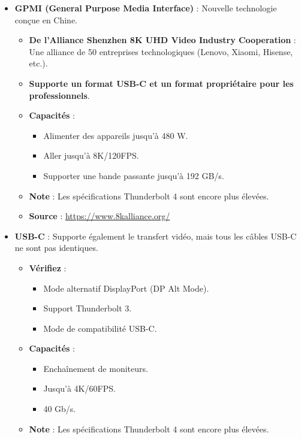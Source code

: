 \documentclass[10pt,a4paper]{article}
\begin{document}
\begin{itemize}
    \item \textbf{GPMI (General Purpose Media Interface)} : Nouvelle technologie conçue en Chine.
    \begin{itemize}
        \item \textbf{De l'Alliance Shenzhen 8K UHD Video Industry Cooperation} : Une alliance de 50 entreprises technologiques (Lenovo, Xiaomi, Hisense, etc.).
        \item \textbf{Supporte un format USB-C et un format propriétaire pour les professionnels}.
        \item \textbf{Capacités} :
        \begin{itemize}
            \item Alimenter des appareils jusqu'à 480 W.
            \item Aller jusqu'à 8K/120FPS.
            \item Supporter une bande passante jusqu'à 192 GB/s.
        \end{itemize}
        \item \textbf{Note} : Les spécifications Thunderbolt 4 sont encore plus élevées.
    \end{itemize}
    \begin{itemize}
        \item \textbf{Source} : \url{https://www.8kalliance.org/}
    \end{itemize}
\end{itemize}

\begin{itemize}
    \item \textbf{USB-C} : Supporte également le transfert vidéo, mais tous les câbles USB-C ne sont pas identiques.
    \begin{itemize}
        \item \textbf{Vérifiez} :
        \begin{itemize}
            \item Mode alternatif DisplayPort (DP Alt Mode).
            \item Support Thunderbolt 3.
            \item Mode de compatibilité USB-C.
        \end{itemize}
        \item \textbf{Capacités} :
        \begin{itemize}
            \item Enchaînement de moniteurs.
            \item Jusqu'à 4K/60FPS.
            \item 40 Gb/s.
        \end{itemize}
        \item \textbf{Note} : Les spécifications Thunderbolt 4 sont encore plus élevées.
    \end{itemize}
\end{itemize}
\end{document}
